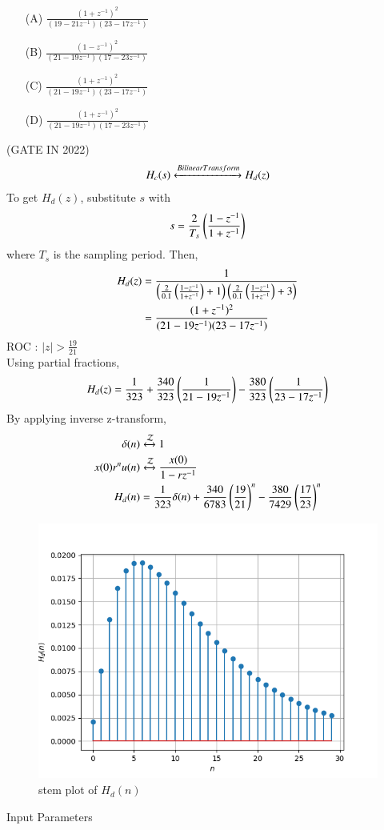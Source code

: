 \documentclass[journal,12pt,twocolumn]{IEEEtran}
\theoremstyle{remark}
\begin{document}
\begin{enumerate}
\item[(A)] $\frac{(1+z^{-1})^2}{(19-21z^{-1})(23-17z^{-1})}$\\
\item[(B)] $\frac{(1-z^{-1})^2}{(21-19z^{-1})(17-23z^{-1})}$\\
\item[(C)] $\frac{(1+z^{-1})^2}{(21-19z^{-1})(23-17z^{-1})}$\\
\item[(D)] $\frac{(1+z^{-1})^2}{(21-19z^{-1})(17-23z^{-1})}$
\end{enumerate}
\hfill{(GATE IN 2022)}\\
\solution
\begin{align}
H_c(s) \xleftrightarrow{Bilinear Transform} H_d(z)
\end{align}
To get $H_d(z)$, substitute $s$ with
\begin{align}
s = \frac{2}{T_s}\left(\frac{1-z^{-1}}{1+z^{-1}}\right)
\end{align}
where $T_s$ is the sampling period. Then,
\begin{align}
H_d(z) &= \frac{1}{\left(\frac{2}{0.1}\left(\frac{1-z^{-1}}{1+z^{-1}}\right)+1\right){\left(\frac{2}{0.1}\left(\frac{1-z^{-1}}{1+z^{-1}}\right)+3\right)}}\\
&= \frac{(1+z^{-1})^2}{(21-19z^{-1})(23-17z^{-1})}
\end{align}
ROC : $|z| > \frac{19}{21}$\\
Using partial fractions,
\begin{align}
H_d(z) = \frac{1}{323} + \frac{340}{323}\left(\frac{1}{21-19z^{-1}}\right) - \frac{380}{323}\left(\frac{1}{23-17z^{-1}}\right)
\end{align}
By applying inverse z-transform,
\begin{align}
\delta(n) &\xleftrightarrow{\mathcal{Z}} 1\\
x(0)r^{n}u(n) &\xleftrightarrow{\mathcal{Z}} \frac{x(0)}{1-rz^{-1}}\\
H_d(n) &= \frac{1}{323}\delta(n) + \frac{340}{6783}\left(\frac{19}{21}\right)^{n} - \frac{380}{7429}\left(\frac{17}{23}\right)^{n}
\end{align}
\begin{figure}[h!]
    \centering
    \includegraphics[width=0.8\columnwidth]{figs/plot.png}
    \caption{stem plot of $H_d(n)$}
    \label{fig:gate2022in38fig}
\end{figure}
\begin{table}[h!]
\centering

\caption{Input Parameters}
\label{tab:gate2022in38table}
\end{table}
\end{document}
